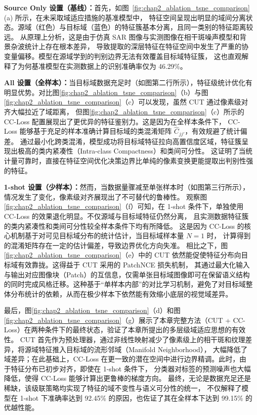 \textbf{Source Only 设置（基线）：}首先，如图~\ref{fig:chap2_ablation_tsne_comparison}(a) 所示，在未采取域适应措施的基准模型中，
特征空间呈现出明显的域间分离状态。源域（红色）与目标域（蓝色）的特征簇基本分离，且同一类别的特征距离较远。
从原理上分析，这是由于仿真 SAR 图像与实测图像在相干斑噪声模型和背景杂波统计上存在根本差异，
导致提取的深层特征在特征空间中发生了严重的协变量偏移。模型在源域学到的判别边界无法有效覆盖目标域特征簇，
这也直观解释了为何基准模型在实测数据上的识别准确率仅为 46.29\%。

\textbf{All 设置（全样本）：}当目标域数据充足时（如图第二行所示），特征级统计优化有明显优势。对比图\ref{fig:chap2_ablation_tsne_comparison}（b）与图\ref{fig:chap2_ablation_tsne_comparison}（c）可以发现，虽然 CUT 通过像素级对齐大幅拉近了域距离，
但图\ref{fig:chap2_ablation_tsne_comparison}（c）所示的 CC-Loss 配置展现出了更优异的特征鉴别力。这是因为在全样本条件下，
CC-Loss 能够基于充足的样本准确计算目标域的类混淆矩阵 $\hat{C}_{jj'}$，有效规避了统计偏差。
通过最小化跨类混淆，模型成功将目标域特征拉向高置信度区域，特征簇呈现出极高的类内紧凑性（Intra-class Compactness）和类间可分性。
这证明了当统计量可靠时，直接在特征空间优化决策边界比单纯的像素变换更能提取出判别性强的特征。

\textbf{1-shot 设置（少样本）：}然而，当数据量骤减至单张样本时（如图第三行所示），情况发生了变化，像素级对齐展现出了不可替代的鲁棒性。
观察图\ref{fig:chap2_ablation_tsne_comparison}（f）可知，在 1-shot 条件下，单独使用 CC-Loss 的效果退化明显。不仅源域与目标域特征仍然分离，
且实测数据特征簇的类内紧凑性和类间可分性较全样本条件下均有所降低。
这是因为 CC-Loss 的核心机制基于对可见目标域分布的统计估计，当目标域样本量 $N=1$ 时，
计算得到的混淆矩阵存在一定的估计偏差，导致边界优化方向失准。
相比之下，图\ref{fig:chap2_ablation_tsne_comparison}（e）中的 CUT 依然能促使特征分布向目标域有效靠拢。这得益于 CUT 采用的 PatchNCE 损失机制，
其通过最大化输入与输出对应图像块（Patch）的互信息，仅需单张目标域图像即可在保留语义结构的同时完成风格迁移。这种基于“单样本内部”的对比学习机制，避免了对目标域整体分布统计的依赖，从而在极少样本下依然能有效缩小底层的视觉域差异。

最后，图\ref{fig:chap2_ablation_tsne_comparison}（d）和图\ref{fig:chap2_ablation_tsne_comparison}（g）展示了本章完整方法（CUT + CC-Loss）在两种条件下的最终状态，验证了本章所提出的多层级域适应思想的有效性。
CUT 首先作为预处理器，通过非线性映射减少了像素级上的相干斑和纹理差异，将源域特征推入目标域的流形邻域（Manifold Neighborhood），
大幅降低了域差异；在此基础上，CC-Loss 在更一致的潜在空间中进行边界精调。此时，由于特征分布已初步对齐，即使在 1-shot 条件下，
分类器对标签的预测噪声也大幅降低，使得 CC-Loss 能够计算出更鲁棒的梯度方向。
最终，无论是数据充足还是稀缺，该级联策略均实现了特征的域不变性与语义可分性的统一，
不仅解释了模型在 1-shot 下准确率达到 92.45\% 的原因，也佐证了其在全样本下达到 99.15\% 的优越性能。



